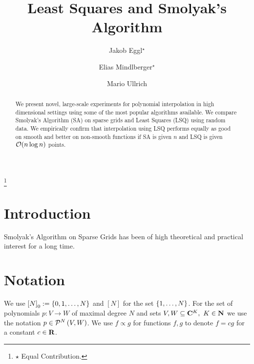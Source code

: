 \documentclass[12pt, oneside]{amsart}
\theoremstyle{definition}
\theoremstyle{remark}
\numberwithin{equation}{section}
\begin{document}
\title{Least Squares and Smolyak's Algorithm}


\author{Jakob Eggl\(^\star\)}
\address{Institute of Analysis, Johannes Kepler University Linz, Austria.}

\author{Elias Mindlberger\(^\star\)}
\address{Institute of Analysis, Johannes Kepler University Linz, Austria.}

\author{Mario Ullrich}
\address{Institute of Analysis, Johannes Kepler University Linz, Austria.}
\thanks{\(\star\) Equal Contribution.}


\begin{abstract}
We present novel, large-scale experiments for polynomial interpolation in high dimensional settings using some of the most popular algorithms available. We compare Smolyak's Algorithm (SA) on sparse grids and Least Squares (LSQ) using random data. We empirically confirm that interpolation using LSQ performs equally as good on smooth and better on non-smooth functions if SA is given \(n\) and LSQ is given \(\cO(n \log n)\) points.
\end{abstract}


\maketitle
\thispagestyle{empty}


\tableofcontents

\newpage
\section{Introduction}
Smolyak's Algorithm on Sparse Grids has been of high theoretical and practical interest for a long time.


\section{Notation}


We use \({[N]}_0 \defn \set{0, 1, \dots, N}\) and \([N]\) for the set \(\set{1, \dots, N}\). For the set of polynomials \(p: V \to W\) of maximal degree \(N\) and sets \(V, W \subseteq \C^K,\ K \in \N\) we use the notation \(p \in \pols[N]{V, W}\). We use \(f \propto g\) for functions \(f, g\) to denote \(f = c g\) for a constant \(c \in \R\).
\end{document}
